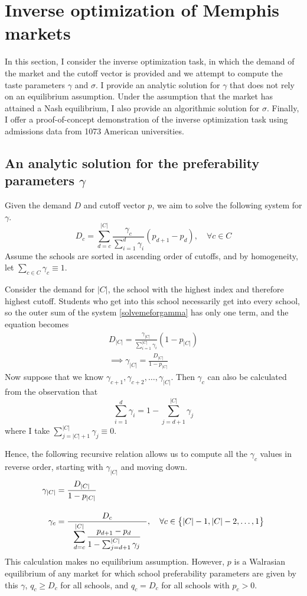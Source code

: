 \documentclass[12pt]{article}
\numberwithin{equation}{subsection}
\theoremstyle{definition}
\begin{document}



\section{Inverse optimization of Memphis markets}
In this section, I consider the inverse optimization task, in which the demand of the market and the cutoff vector is provided and we attempt to compute the taste parameters $\gamma$ and $\sigma$. I provide an analytic solution for $\gamma$ that does not rely on an equilibrium assumption. Under the assumption that the market has attained a Nash equilibrium, I also provide an algorithmic solution for $\sigma$. Finally, I offer a proof-of-concept demonstration of the inverse optimization task using admissions data from 1073 American universities. 

\subsection{An analytic solution for the preferability parameters $\gamma$}
Given the demand $D$ and cutoff vector $p$, we aim to solve the following system for $\gamma$.
\begin{equation}
D_c = \sum_{d=c}^{|C|} 
\frac{\gamma_c}{ \sum_{i=1}^d \gamma_i} 
\left(p_{d+1} - p_{d}\right),
\quad \forall c \in C
 \label{solvemeforgamma}
 \end{equation}
Assume the schools are sorted in ascending order of cutoffs, and by homogeneity, let $\sum_{c \in C} \gamma_c \equiv 1$.

Consider the demand for $|C|$, the school with the highest index and therefore highest cutoff. Students who get into this school necessarily get into every school, so the outer sum of the system \eqref{solvemeforgamma} has only one term, and the equation becomes
\begin{align}D_{|C|} =
\frac{\gamma_{|C|}}{ \sum_{i=1}^{|C|} \gamma_i} 
\left(1 - p_{|C|}\right) \\
\implies \gamma_{|C|} = \frac{D_{|C|}}{1 - p_{|C|}}
\end{align}
Now suppose that we know $\gamma_{c+1}, \gamma_{c+2}, \dots, \gamma_{|C|}$. Then $\gamma_c$ can also be calculated from the observation that
\[\sum_{i=1}^d \gamma_i = 1 - \sum_{j=d+1}^{|C|} \gamma_j\]
where I take $\sum_{j=|C|+1}^{|C|} \gamma_j \equiv 0$.

Hence, the following recursive relation allows us to compute all the $\gamma_c$ values in reverse order, starting with $\gamma_{|C|}$ and moving down.
\begin{align}
\gamma_{|C|} &= \frac{D_{|C|}}{1 - p_{|C|}} \\[1em]
\gamma_c &= \frac{D_c}{~~\mathlarger{\sum_{d=c}^{|C|} \frac{p_{d+1} - p_d}{1 - \sum_{j=d+1}^{|C|} \gamma_j} ~~}}, \quad \forall c \in \bigl\{ |C|-1, |C|-2, \dots, 1\bigr\} \label{gammarecursion}
\end{align}
This calculation makes no equilibrium assumption. However, $p$ is a Walrasian equilibrium of any market for which school preferability parameters are given by this $\gamma$, $q_c \geq D_c$ for all schools, and $q_c = D_c$ for all schools with $p_c > 0$. 
\end{document}
